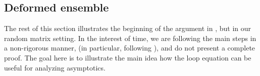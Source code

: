 \documentclass[letterpaper,11pt,oneside,reqno]{article}
\numberwithin{equation}{section}
\newcommand{\ssp}{\hspace{1pt}}
\theoremstyle{definition}
\begin{document}

%
%
%
\subsection{Deformed ensemble}

The rest of this section 
illustrates the beginning of the argument in
\cite{gorin2022dynamical},
but in our random matrix setting.
In the interest of time, we are following the main steps in a non-rigorous manner,
(in particular, following \cite[Section~4.2]{gorin2022dynamical}), and do 
not present a complete proof.
The goal here is to illustrate the main idea how the loop equation can be useful for 
analyzing asymptotics.
\end{document}
